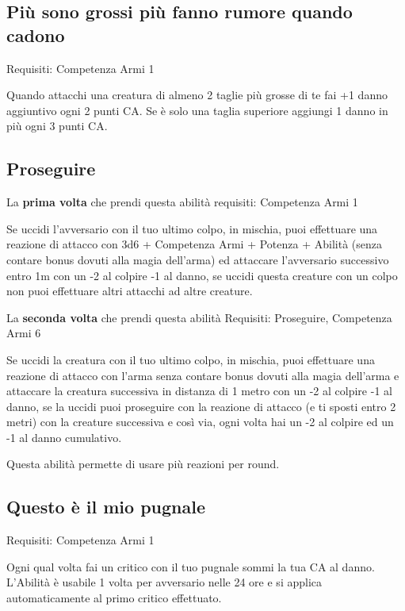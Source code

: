 \documentclass[a4paper,11pt,twoside,openany]{book}
\begin{document}
\subsection{Più sono grossi più fanno rumore quando cadono}

Requisiti: Competenza Armi 1

Quando attacchi una creatura di almeno 2 taglie più grosse di te fai +1 danno aggiuntivo ogni 2 punti CA. Se è solo una taglia superiore aggiungi 1 danno in più ogni 3 punti CA.

\subsection{Proseguire}

La \textbf{prima volta} che prendi questa abilità requisiti: Competenza Armi 1

Se uccidi l'avversario con il tuo ultimo colpo, in mischia, puoi effettuare una reazione di attacco con 3d6 + Competenza Armi + Potenza + Abilità (senza contare bonus dovuti alla magia dell'arma) ed attaccare l'avversario successivo entro 1m con un -2 al colpire -1 al danno, se uccidi questa creature con un colpo non puoi effettuare altri attacchi ad altre creature.

La \textbf{seconda volta} che prendi questa abilità Requisiti: Proseguire, Competenza Armi 6

Se uccidi la creatura con il tuo ultimo colpo, in mischia, puoi effettuare una reazione di attacco con l'arma senza contare bonus dovuti alla magia dell'arma e attaccare la creatura successiva in distanza di 1 metro con un -2 al colpire -1 al danno, se la uccidi puoi proseguire con la reazione di attacco (e ti sposti entro 2 metri) con la creature successiva e così via, ogni volta hai un -2 al colpire ed un -1 al danno cumulativo.

Questa abilità permette di usare più reazioni per round.

\subsection{Questo è il mio pugnale}

Requisiti: Competenza Armi 1

Ogni qual volta fai un critico con il tuo pugnale sommi la tua CA al danno. L'Abilità è usabile 1 volta per avversario nelle 24 ore e si applica automaticamente al primo critico effettuato.
\end{document}
